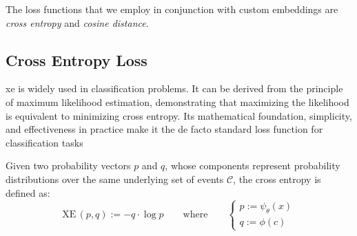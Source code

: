 The loss functions that we employ in conjunction with custom embeddings are \emph{cross entropy} and \emph{cosine distance}.


\subsection{Cross Entropy Loss}
\label{subsec:cross-entropy-loss}

\acrfull{xe} is widely used in classification problems. It can be derived from the principle of maximum likelihood estimation, demonstrating that maximizing the likelihood is equivalent to minimizing cross entropy. Its mathematical foundation, simplicity, and effectiveness in practice make it the de facto standard loss function for classification tasks~\cite{ImagenetClassiKrizhe2017, VeryDeepConvoSimony2014, GoingDeeperWiSzeged2014, DeepResidualLHeKa2015, DenselyConnectHuang2016, EfficientnetRTanM2019, Efficientnetv2TanM2021, AnImageIsWorDosovi2020}

Given two probability vectors $p$ and $q$, whose components represent probability distributions over the same underlying set of events $\mathcal{C}$, the cross entropy is defined as:
\begin{equation}
  \textrm{XE} \, (p, q) := - q \cdot \log p
  \label{eq:cross-entropy}
  \qquad \textrm{where} \qquad
  \begin{cases}
    p := \psi_\theta(x) \\
    q := \phi(c)
  \end{cases}
\end{equation}

